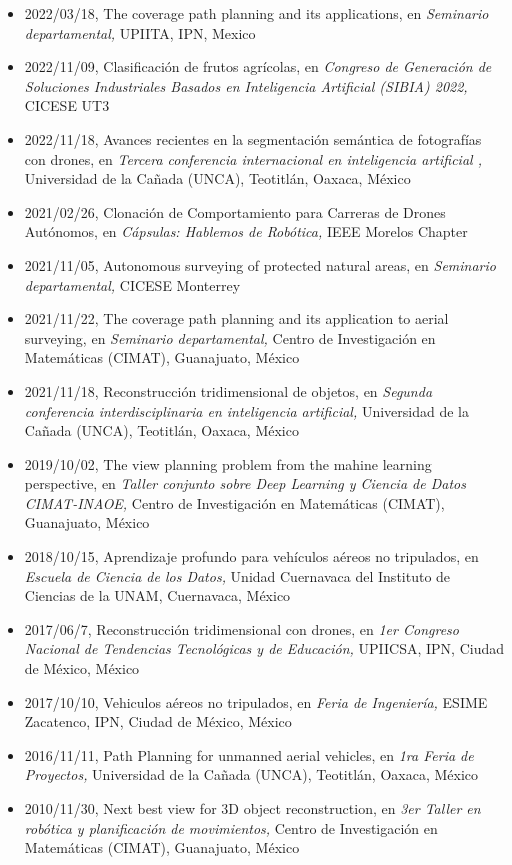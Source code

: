 \begin{itemize} 
\item 2022/03/18, The coverage path planning and its applications, en \textit{ Seminario departamental,} UPIITA, IPN, Mexico 
\item 2022/11/09, Clasificación de frutos agrícolas, en \textit{ Congreso de Generación de Soluciones Industriales Basados en Inteligencia Artificial (SIBIA) 2022,} CICESE UT3 
\item 2022/11/18, Avances recientes en la segmentación semántica de fotografías con drones, en \textit{ Tercera conferencia internacional en inteligencia artificial ,} Universidad de la Cañada (UNCA), Teotitlán, Oaxaca, México 
\item 2021/02/26, Clonación de Comportamiento para Carreras de Drones Autónomos, en \textit{ Cápsulas: Hablemos de Robótica,} IEEE Morelos Chapter 
\item 2021/11/05, Autonomous surveying of protected natural areas, en \textit{ Seminario departamental,} CICESE Monterrey 
\item 2021/11/22, The coverage path planning and its application to aerial surveying, en \textit{ Seminario departamental,} Centro de Investigación en Matemáticas (CIMAT), Guanajuato, México 
\item 2021/11/18, Reconstrucción tridimensional de objetos, en \textit{ Segunda conferencia interdisciplinaria en inteligencia artificial,} Universidad de la Cañada (UNCA), Teotitlán, Oaxaca, México 
\item 2019/10/02, The view planning problem from the mahine learning perspective, en \textit{ Taller conjunto sobre Deep Learning y Ciencia de Datos CIMAT-INAOE,} Centro de Investigación en Matemáticas (CIMAT), Guanajuato, México 
\item 2018/10/15, Aprendizaje profundo para vehículos aéreos no tripulados, en \textit{ Escuela de Ciencia de los Datos,} Unidad Cuernavaca del Instituto de Ciencias de la UNAM, Cuernavaca, México 
\item 2017/06/7, Reconstrucción tridimensional con drones, en \textit{ 1er Congreso Nacional de Tendencias Tecnológicas y de Educación,} UPIICSA, IPN, Ciudad de México, México 
\item 2017/10/10, Vehiculos aéreos no tripulados, en \textit{ Feria de Ingeniería,} ESIME Zacatenco, IPN, Ciudad de México, México 
\item 2016/11/11, Path Planning for unmanned aerial vehicles, en \textit{ 1ra Feria de Proyectos,} Universidad de la Cañada (UNCA), Teotitlán, Oaxaca, México 
\item 2010/11/30, Next best view for 3D object reconstruction, en \textit{ 3er Taller en robótica y planificación de movimientos,} Centro de Investigación en Matemáticas (CIMAT), Guanajuato, México 
\end{itemize} 
